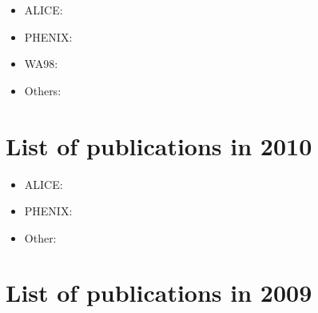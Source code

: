 \documentclass[12pt]{article}
\begin{document}
\begin{itemize}
\item ALICE:
\cite{
ALICE:2011ab,
Aamodt:2011gj,
Aamodt:2011zj,
Aamodt:2011kd,
Aamodt:2011mr,
Aamodt:2011zza,
Aamodt:2010cz,
Aamodt:2010jd,
Rak:2011zza}

\item PHENIX:
\cite{
Adare:2011sc,
Adare:2011tg,
Adare:2011yf,
Adare:2011vy,
Adare:2010ud,
Adare:2010mq,
Adare:2010fn,
Adare:2010cy,
Adare:2010cc,
Adare:2010xa,
Adare:2010fe,
Adare:2010de,
Adare:2010pt,
Adare:2011ht}
%

\item WA98:
\cite{
Collaboration:2011rsa}

\item Others:
\cite{Rak:2011zza}

\end{itemize}


\section{List of publications in 2010}

\begin{itemize}
\item ALICE:
\cite{
Aamodt:2010pa,
Aamodt:2010pb,
Aamodt:2010jj,
Aamodt:2010my,
Aamodt:2010dx,
Aamodt:2010pp,
Aamodt:2010ft,
Allen:2009aa,
Aamodt:2009aa}

\item PHENIX:
\cite{
Adare:2010bd,
Adare:2010sp,
Adare:2010yw,
Adare:2010dc,
Adare:2010ux,
Adare:2010ry,
Adare:2009js,
Adare:2009qk,
Adare:2009aa,
Adare:2008ab}

\item Other:
\cite{Allen:2009aa,
Kim:2010zj,
Muller:2010zzc}

\end{itemize}


\section{List of publications in 2009}
\end{document}
